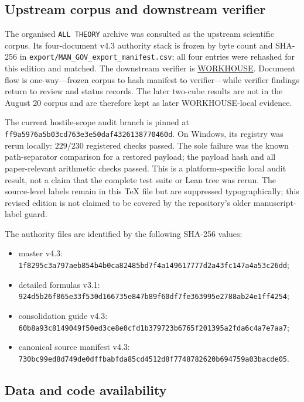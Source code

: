 \documentclass[11pt]{article}
\theoremstyle{plain}
\theoremstyle{definition}
\theoremstyle{remark}
\newcommand{\chk}[1]{}
\begin{document}
\subsection{Upstream corpus and downstream verifier}

The organised \texttt{ALL THEORY} archive was consulted as
the upstream scientific corpus. Its four-document v4.3 authority stack is
frozen by byte count and SHA-256 in
\nolinkurl{export/MAN_GOV_export_manifest.csv}; all four entries were
rehashed for this edition and matched. The downstream verifier is
\href{https://github.com/ats314/WORKHOUSE}{WORKHOUSE}. Document flow is
one-way---frozen corpus to hash manifest to verifier---while verifier findings
return to review and status records. The later two-cube results are not in the
August 20 corpus and are therefore kept as later WORKHOUSE-local evidence.

The current hostile-scope audit branch is pinned at
\nolinkurl{ff9a5976a5b03cd763e3e50daf4326138770460d}. On Windows, its registry was
rerun locally: $229/230$ registered checks passed. The sole failure was the
known path-separator comparison for a restored payload; the payload hash and
all paper-relevant arithmetic checks passed. This is a platform-specific local
audit result, not a claim that the complete test suite or Lean tree was rerun.
The source-level \texttt{\string\chk} labels remain in this TeX file but are
suppressed typographically; this revised edition is not claimed to be covered
by the repository's older manuscript-label guard.

The authority files are identified by the following SHA-256 values:
\begin{itemize}
\item master v4.3:
  \nolinkurl{1f8295c3a797aeb854b4b0ca82485bd7f4a149617777d2a43fc147a4a53c26dd};
\item detailed formulas v3.1:
  \nolinkurl{924d5b26f865e33f530d166735e847b89f60df7fe363995e2788ab24e1ff4254};
\item consolidation guide v4.3:
  \nolinkurl{60b8a93c8149049f50ed3ce8e0cfd1b379723b6765f201395a2fda6c4a7e7aa7};
\item canonical source manifest v4.3:
  \nolinkurl{730bc99ed8d749de0dffbabfda85cd4512d8f7748782620b694759a03bacde05}.
\end{itemize}

\subsection{Data and code availability}
\end{document}
